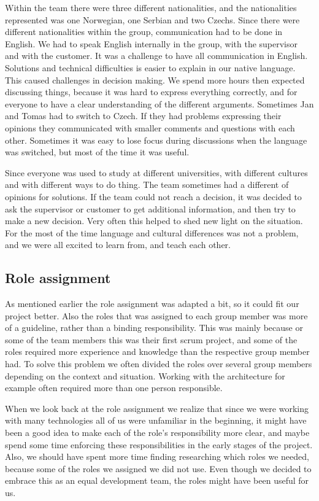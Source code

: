 Within the team there were three different nationalities, and the nationalities represented was one Norwegian, one Serbian and two Czechs. Since there were different nationalities within the group, communication had to be done in English. We had to speak English internally in the group, with the supervisor and with the customer. It was a challenge to have all communication in English. Solutions and 
technical difficulties is easier to explain in our native language. This caused challenges in decision making. We spend more hours then expected discussing things, because it was hard to express everything correctly, and for everyone to have a clear understanding of the different arguments. Sometimes Jan and Tomas had to switch to Czech. If they had problems expressing their opinions they communicated with smaller comments and questions with each other. Sometimes it was easy to lose focus during discussions when the language was switched, but most of the time it was useful.

Since everyone was used to study at different universities, with different cultures and with different ways to do thing. The team sometimes had a different of opinions for solutions. If the team could not reach a decision, it was decided to ask the supervisor or customer to get additional information, and then try to make a new decision. Very often this helped to shed new light on the situation.  For the most of the time language and cultural differences was not a problem, and we were all excited to learn from, and teach each other. 

\subsection{Role assignment}
As mentioned earlier the role assignment was adapted a bit, so it could fit our project better. Also the roles that was assigned to each group member was more of a guideline, rather than a binding responsibility. This was mainly because or some of the team members this was their first scrum project, and some of the roles required more experience and knowledge than the respective group member had. To solve this problem we often divided the roles over several group members depending on the context and situation. Working with the architecture for example often required more than one person responsible. 

When we look back at the role assignment we realize that since we were working with many technologies all of us were unfamiliar in the beginning, it might have been a good idea to make each of the role's responsibility more clear, and maybe spend some time enforcing these responsibilities in the early stages of the project. Also, we should have spent more time finding researching which roles we needed, because some of the roles we assigned we did not use. Even though we decided to embrace this as an equal development team, the roles might have been useful for us. 

